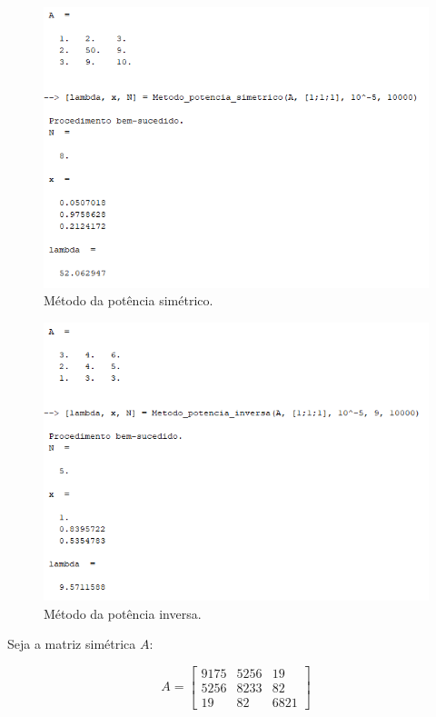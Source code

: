 \documentclass[11pt]{article}
\begin{document}
\begin{enumerate}
\begin{figure}[H]
    \centering
    \includegraphics[]{4-2}
    \caption{Método da potência simétrico.}
\end{figure}

\begin{figure}[H]
    \centering
    \includegraphics[]{4-3}
    \caption{Método da potência inversa.}
\end{figure}

Seja a matriz simétrica $A$:

$$A = \begin{bmatrix}
    9175& 5256& 19\\  
    5256& 8233& 82\\  
    19& 82& 6821
\end{bmatrix}$$


\end{enumerate}
\end{document}
